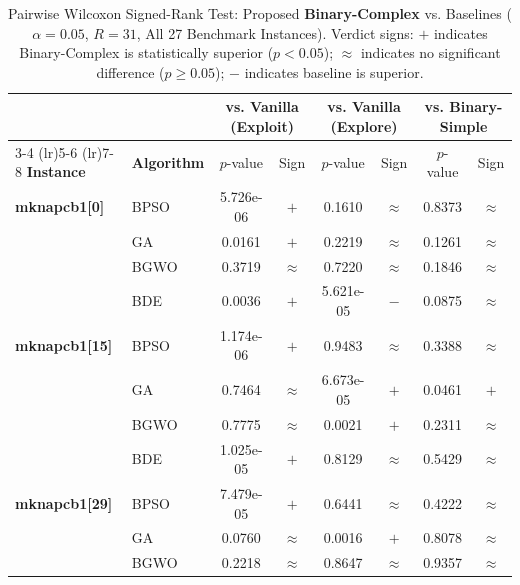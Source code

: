 \begin{table}[htbp]
  \centering
  \small
  \caption{Pairwise Wilcoxon Signed-Rank Test: Proposed \textbf{Binary-Complex} vs. Baselines ($\alpha=0.05$, $R=31$, All 27 Benchmark Instances). Verdict signs: $+$ indicates Binary-Complex is statistically superior ($p < 0.05$); $\approx$ indicates no significant difference ($p \ge 0.05$); $-$ indicates baseline is superior.}
  \label{tab:wilcoxon_all_instances}
  \begin{tabular*}{\textwidth}{@{\extracolsep{\fill}}llcccccc@{}}
    \toprule
    & & \multicolumn{2}{c}{\textbf{vs. Vanilla (Exploit)}} & \multicolumn{2}{c}{\textbf{vs. Vanilla (Explore)}} & \multicolumn{2}{c}{\textbf{vs. Binary-Simple}} \\
    \cmidrule(lr){3-4} \cmidrule(lr){5-6} \cmidrule(lr){7-8}
    \textbf{Instance} & \textbf{Algorithm} & $p$-value & Sign & $p$-value & Sign & $p$-value & Sign \\
    \midrule
    \textbf{mknapcb1[0]} & BPSO  & 5.726e-06 & $+$ &    0.1610 & $\approx$ &    0.8373 & $\approx$ \\
                       & GA    &    0.0161 & $+$ &    0.2219 & $\approx$ &    0.1261 & $\approx$ \\
                       & BGWO  &    0.3719 & $\approx$ &    0.7220 & $\approx$ &    0.1846 & $\approx$ \\
                       & BDE   &    0.0036 & $+$ & 5.621e-05 & $-$ &    0.0875 & $\approx$ \\
    \midrule
    \textbf{mknapcb1[15]} & BPSO  & 1.174e-06 & $+$ &    0.9483 & $\approx$ &    0.3388 & $\approx$ \\
                       & GA    &    0.7464 & $\approx$ & 6.673e-05 & $+$ &    0.0461 & $+$ \\
                       & BGWO  &    0.7775 & $\approx$ &    0.0021 & $+$ &    0.2311 & $\approx$ \\
                       & BDE   & 1.025e-05 & $+$ &    0.8129 & $\approx$ &    0.5429 & $\approx$ \\
    \midrule
    \textbf{mknapcb1[29]} & BPSO  & 7.479e-05 & $+$ &    0.6441 & $\approx$ &    0.4222 & $\approx$ \\
                       & GA    &    0.0760 & $\approx$ &    0.0016 & $+$ &    0.8078 & $\approx$ \\
                       & BGWO  &    0.2218 & $\approx$ &    0.8647 & $\approx$ &    0.9357 & $\approx$ \\

\end{tabular*}
\end{table}

